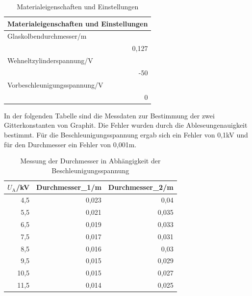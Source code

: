 \documentclass[12pt,a4paper]{article}
\begin{document}
\begin{table}[H]
\caption{Materialeigenschaften und Einstellungen}
\begin{center}
\begin{tabular}{|l|}
\hline
Materialeigenschaften und Einstellungen \\ \hline
Glaskolbendurchmesser/m \\ \hline
\multicolumn{1}{|r|}{0,127} \\ \hline
Wehneltzylinderspannung/V \\ \hline
\multicolumn{1}{|r|}{-50} \\ \hline
Vorbeschleunigungsspannung/V \\ \hline
\multicolumn{1}{|r|}{0} \\ \hline
\end{tabular}
\end{center}
\label{tab:a_2_m}
\end{table}

\newpage
In der folgenden Tabelle sind die Messdaten zur Bestimmung der zwei Gitterkonstanten von Graphit. Die Fehler wurden durch die Ableseungenauigkeit bestimmt. Für die Beschleunigungsspannung ergab sich ein Fehler von 0,1kV und für den Durchmesser ein Fehler von 0,001m.

\begin{table}[H]
\caption{Messung der Durchmesser in Abhängigkeit der Beschleunigungsspannung}
\begin{center}
\begin{tabular}{|r|r|r|}
\hline
$U_\text{A}$/kV & Durchmesser\_1/m & Durchmesser\_2/m \\ \hline
4,5 & 0,023 & 0,04 \\ \hline
5,5 & 0,021 & 0,035 \\ \hline
6,5 & 0,019 & 0,033 \\ \hline
7,5 & 0,017 & 0,031 \\ \hline
8,5 & 0,016 & 0,03 \\ \hline
9,5 & 0,015 & 0,029 \\ \hline
10,5 & 0,015 & 0,027 \\ \hline
11,5 & 0,014 & 0,025 \\ \hline
\end{tabular}
\end{center}
\label{tab:a_2}
\end{table}
\end{document}
